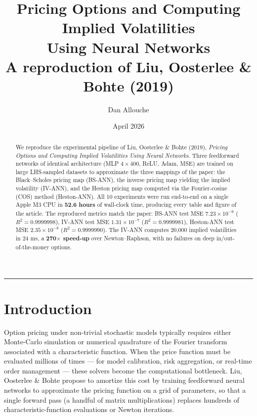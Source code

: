 \documentclass[11pt,a4paper]{article}
\title{\textbf{Pricing Options and Computing Implied Volatilities\\
Using Neural Networks}\\[0.3em]
\large A reproduction of Liu, Oosterlee \& Bohte (2019)}
\author{Dan Allouche}
\date{April 2026}
\begin{document}
\maketitle

\begin{abstract}
We reproduce the experimental pipeline of Liu, Oosterlee \& Bohte (2019),
\emph{Pricing Options and Computing Implied Volatilities Using Neural Networks}.
Three feedforward networks of identical architecture (MLP $4\times400$, ReLU,
Adam, MSE) are trained on large LHS-sampled datasets to approximate the three
mappings of the paper: the Black--Scholes pricing map (BS-ANN), the inverse
pricing map yielding the implied volatility (IV-ANN), and the Heston pricing
map computed via the Fourier-cosine (COS) method (Heston-ANN).
All 10 experiments were run end-to-end on a single Apple M3 CPU in
\textbf{52.6 hours} of wall-clock time, producing every table and figure of
the article. The reproduced metrics match the paper: BS-ANN test MSE
$7.23 \times 10^{-9}$ ($R^2 = 0.9999998$), IV-ANN test MSE
$1.31 \times 10^{-7}$ ($R^2 = 0.9999981$), Heston-ANN test MSE
$2.35 \times 10^{-8}$ ($R^2 = 0.9999990$). The IV-ANN computes 20,000 implied
volatilities in 24 ms, a \textbf{270$\times$ speed-up} over Newton--Raphson,
with no failures on deep in/out-of-the-money options.
\end{abstract}

\tableofcontents

\vspace{1em}\hrule\vspace{1em}

\section{Introduction}
\label{sec:intro}

Option pricing under non-trivial stochastic models typically requires either
Monte-Carlo simulation or numerical quadrature of the Fourier transform
associated with a characteristic function. When the price function must be
evaluated millions of times --- for model calibration, risk aggregation, or
real-time order management --- these solvers become the computational
bottleneck. Liu, Oosterlee \& Bohte \cite{liu2019} propose to amortize this
cost by training feedforward neural networks to approximate the pricing
function on a grid of parameters, so that a single forward pass (a handful of
matrix multiplications) replaces hundreds of characteristic-function
evaluations or Newton iterations.
\end{document}
